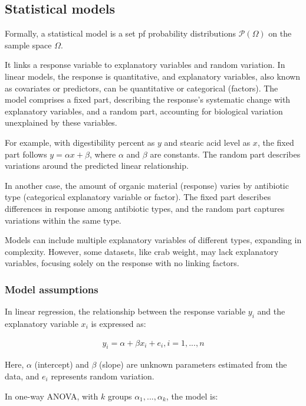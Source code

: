 \documentclass{article}
\begin{document}
\subsection{Statistical models}

Formally, a statistical model is a set pf probability distributions $\mathcal{P}(\Omega)$ on the sample space $\Omega$. 

It links a response variable to explanatory variables and random variation. In linear models, the response is quantitative, and explanatory variables, also known as covariates or predictors, can be quantitative or categorical (factors). The model comprises a fixed part, describing the response's systematic change with explanatory variables, and a random part, accounting for biological variation unexplained by these variables.

For example, with digestibility percent as $y$ and stearic acid level as $x$, the fixed part follows $y=\alpha x + \beta$, where $\alpha$ and $\beta$ are constants. The random part describes variations around the predicted linear relationship.

In another case, the amount of organic material (response) varies by antibiotic type (categorical explanatory variable or factor). The fixed part describes differences in response among antibiotic types, and the random part captures variations within the same type.

Models can include multiple explanatory variables of different types, expanding in complexity. However, some datasets, like crab weight, may lack explanatory variables, focusing solely on the response with no linking factors.

\subsubsection{Model assumptions}

In linear regression, the relationship between the response variable $y_i$ and the explanatory variable $x_i$ is expressed as:

\begin{align*}
y_i = \alpha + \beta x_i + e_i, i=1,...,n
\end{align*}

Here, $\alpha$ (intercept) and $\beta$ (slope) are unknown parameters estimated from the data, and $e_i$ represents random variation.

\pagebreak

In one-way ANOVA, with $k$ groups $\alpha_1,...,\alpha_k$, the model is:
\end{document}
